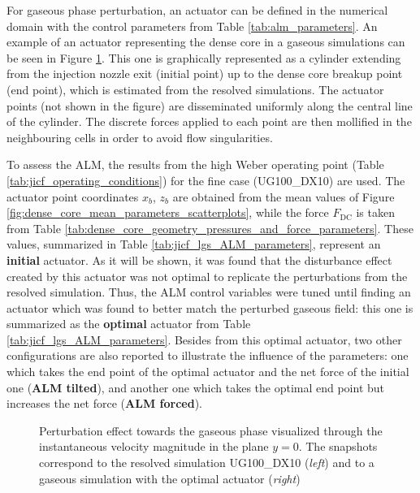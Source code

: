 
For gaseous phase perturbation, an actuator can be defined in the numerical domain with the control parameters from Table \ref{tab:alm_parameters}. An example of an actuator representing the dense core in a gaseous simulations can be seen in Figure \ref{fig:u_inst_SPS_and_ALM}. This one is graphically represented as a cylinder extending from the injection nozzle exit (initial point) up to the dense core breakup point (end point), which is estimated from the resolved simulations. The actuator points (not shown in the figure) are disseminated uniformly along the central line of the cylinder. The discrete forces applied to each point are then mollified in the neighbouring cells in order to avoid flow singularities. 

To assess the ALM, the results from the high Weber operating point (Table \ref{tab:jicf_operating_conditions}) for the fine case (UG100\_DX10) are used. The actuator point coordinates $x_b$, $z_b$ are obtained from the mean values of Figure \ref{fig:dense_core_mean_parameters_scatterplots}, while the force $F_\mathrm{DC}$ is taken from Table \ref{tab:dense_core_geometry_pressures_and_force_parameters}. These values, summarized in Table \ref{tab:jicf_lgs_ALM_parameters}, represent an \textbf{initial} actuator. As it will be shown, it was found that the disturbance effect created by this actuator was not optimal to replicate the perturbations from the resolved simulation. Thus, the ALM control variables were tuned until finding an actuator which was found to better match the perturbed gaseous field: this one is summarized as the \textbf{optimal} actuator from Table \ref{tab:jicf_lgs_ALM_parameters}. Besides from this optimal actuator, two other configurations are also reported to illustrate the influence of the parameters: one which takes the end point of the optimal actuator and the net force of the initial one (\textbf{ALM tilted}), and another one which takes the optimal end point but increases the net force (\textbf{ALM forced}). 




\begin{figure}[h!]
	\centering	{}
	\caption[Perturbation effect towards the gaseous phase visualized through the instantaneous velocity magnitude in the plane $y = 0$]{Perturbation effect towards the gaseous phase visualized through the instantaneous velocity magnitude in the plane $y = 0$. The snapshots correspond to the resolved simulation UG100\_DX10 (\textsl{left}) and to a gaseous simulation with the optimal actuator (\textsl{right})}	
	\label{fig:u_inst_SPS_and_ALM}
\end{figure}


